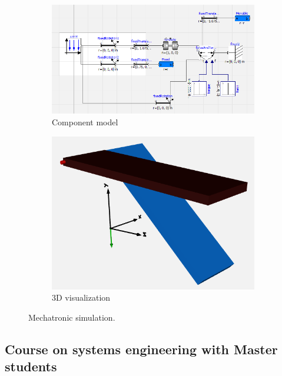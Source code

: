 \documentclass{PDS}
\begin{document}
\begin{figure}[htbp]
    \begin{subfigure}[b]{0.56\textwidth}
        \centering
        \includegraphics[width=\textwidth]{./figures/glasshouse_mechatronic_1.png}
        \caption{Component model}
    \end{subfigure}
    \hfill
    \begin{subfigure}[b]{0.4\textwidth}
        \centering
        \includegraphics[width=\textwidth]{./figures/glasshouse_mechatronic_2.png}
        \caption{3D visualization}
    \end{subfigure}
    \caption{Mechatronic simulation.}
\end{figure}

\subsection{Course on systems engineering with Master students}
\end{document}
